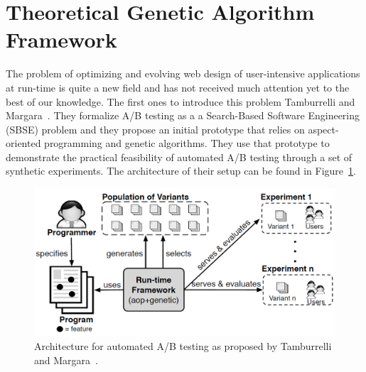 \documentclass{report}
\begin{document}
\section{Theoretical Genetic Algorithm Framework}
The problem of optimizing and evolving web design of user-intensive applications at run-time is quite a new field and has not received much attention yet to the best of our knowledge. The first ones to introduce this problem Tamburrelli and Margara~\cite{tamburrelli2014towards}. They formalize A/B testing as a a Search-Based Software Engineering (SBSE) problem and they propose an initial prototype that relies on aspect-oriented programming and genetic algorithms. They use that prototype to demonstrate the practical feasibility of automated A/B testing through a set of synthetic experiments. The architecture of their setup can be found in Figure~\ref{fig:archpaper}.\\

\begin{figure}[ht]
	\centering
	\includegraphics[width=\linewidth]{imgs/archpaper.PNG}
	\caption{Architecture for automated A/B testing as proposed by Tamburrelli and Margara~\cite{tamburrelli2014towards}.}
	\label{fig:archpaper}
\end{figure}
\end{document}
